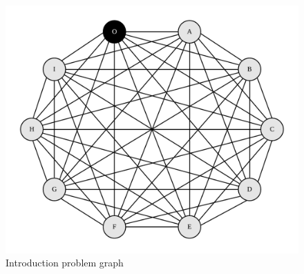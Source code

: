\documentclass[a4paper]{article}
\begin{document}
\begin{figure}[H]
    \centering
    \includegraphics{images/CoffeeGraph.png}
    \caption{Introduction problem graph}
    \label{fig:my_label}
\end{figure}
\end{document}
